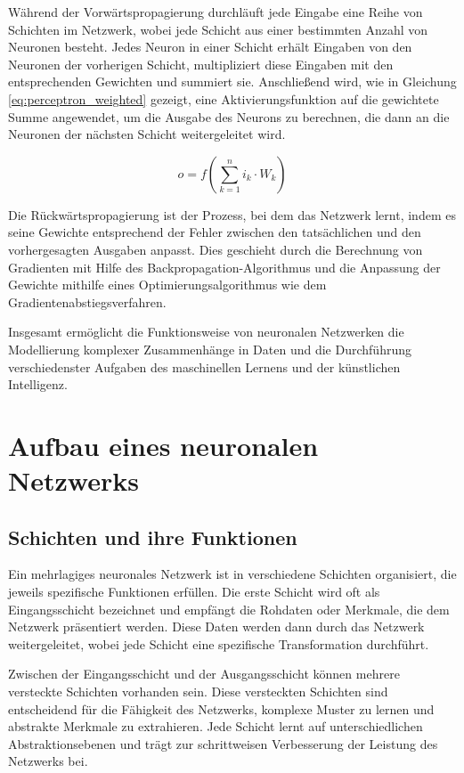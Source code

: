 Während der Vorwärtspropagierung durchläuft jede Eingabe eine Reihe von Schichten im Netzwerk, wobei jede Schicht aus einer bestimmten Anzahl von Neuronen besteht. Jedes Neuron in einer Schicht erhält Eingaben von den Neuronen der vorherigen Schicht, multipliziert diese Eingaben mit den entsprechenden Gewichten und summiert sie. Anschließend wird, wie in Gleichung \ref{eq:perceptron_weighted} gezeigt, eine Aktivierungsfunktion auf die gewichtete Summe angewendet, um die Ausgabe des Neurons zu berechnen, die dann an die Neuronen der nächsten Schicht weitergeleitet wird.

\begin{equation}
    o=f\left(\sum_{k=1}^{n}i_{k}\cdot W_{k}\right)
    \label{eq:perceptron_weighted}
\end{equation}

Die Rückwärtspropagierung ist der Prozess, bei dem das Netzwerk lernt, indem es seine Gewichte entsprechend der Fehler zwischen den tatsächlichen und den vorhergesagten Ausgaben anpasst. Dies geschieht durch die Berechnung von Gradienten mit Hilfe des Backpropagation-Algorithmus  und die Anpassung der Gewichte mithilfe eines Optimierungsalgorithmus wie dem Gradientenabstiegsverfahren.

Insgesamt ermöglicht die Funktionsweise von neuronalen Netzwerken die Modellierung komplexer Zusammenhänge in Daten und die Durchführung verschiedenster Aufgaben des maschinellen Lernens und der künstlichen Intelligenz.

\section{Aufbau eines neuronalen Netzwerks}
\label{sec:Grundlagen_Aufbau_neuronale_Netzwerke}

\subsection{Schichten und ihre Funktionen}
\label{sec:Grundlagen_Schichten}
Ein mehrlagiges neuronales Netzwerk ist in verschiedene Schichten organisiert, die jeweils spezifische Funktionen erfüllen. Die erste Schicht wird oft als Eingangsschicht bezeichnet und empfängt die Rohdaten oder Merkmale, die dem Netzwerk präsentiert werden. Diese Daten werden dann durch das Netzwerk weitergeleitet, wobei jede Schicht eine spezifische Transformation durchführt.

Zwischen der Eingangsschicht und der Ausgangsschicht können mehrere versteckte Schichten vorhanden sein. Diese versteckten Schichten sind entscheidend für die Fähigkeit des Netzwerks, komplexe Muster zu lernen und abstrakte Merkmale zu extrahieren. Jede Schicht lernt auf unterschiedlichen Abstraktionsebenen und trägt zur schrittweisen Verbesserung der Leistung des Netzwerks bei.

